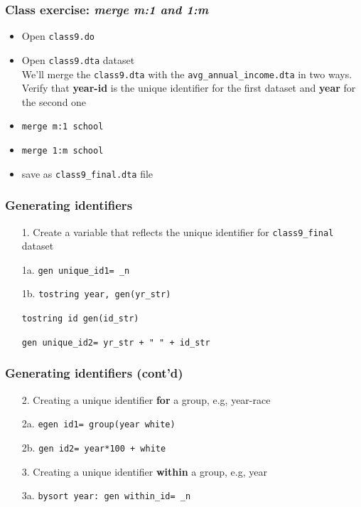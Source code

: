 \documentclass[11pt]{beamer}
\begin{document}
\begin{frame}
\frametitle{Class exercise: \textit{merge m:1 and 1:m}}
\begin{itemize}
\item Open \texttt{class9.do} 
\item Open \texttt{class9.dta} dataset \\
\bigskip
We'll merge the \texttt{class9.dta} with the \texttt{avg\_annual\_income.dta} in two ways. \\
Verify that \textbf{year-id} is the unique identifier for the first dataset and \textbf{year} for the second one \\
\bigskip
\item \texttt{merge m:1 school}
\item \texttt{merge 1:m school}
\item save as \texttt{class9\_final.dta} file
\end{itemize}
\end{frame}


\begin{frame}
\frametitle{Generating identifiers}
\begin{itemize}
\item[1. ] Create a variable that reflects the unique identifier for \texttt{class9\_final} dataset
\item[1a. ] \texttt{gen unique\_id1= \_n}
\item[1b. ] \texttt{tostring year, gen(yr\_str)}
\item[     ] \texttt{tostring id gen(id\_str)}
\item[     ] \texttt{gen unique\_id2= yr\_str + " " + id\_str}
\end{itemize}
\end{frame}


\begin{frame}
\frametitle{Generating identifiers (cont'd)}
\begin{itemize}
\item[2. ] Creating a unique identifier \textbf{for} a group, e.g, year-race
\item[2a.] \texttt{egen id1= group(year white)}
\item[2b.] \texttt{gen id2= year*100 + white}
\bigskip \pause
\item[3. ] Creating a unique identifier \textbf{within} a group, e.g, year
\item[3a.] \texttt{bysort year: gen within\_id= \_n}
\end{itemize}
\end{frame}
\end{document}
